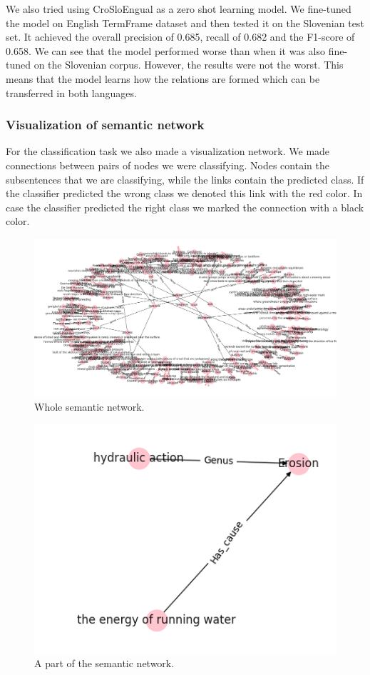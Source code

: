 \documentclass[fleqn,moreauthors,10pt]{ds_report}
\begin{document}
We also tried using CroSloEngual as a zero shot learning model. We fine-tuned the model on English TermFrame dataset and then tested it on the Slovenian test set. It achieved the overall precision of 0.685, recall of 0.682 and the F1-score of 0.658. We can see that the model performed worse than when it was also fine-tuned on the Slovenian corpus. However, the results were not the worst. This means that the model learns how the relations are formed which can be transferred in both languages.


\subsubsection{Visualization of semantic network}
For the classification task we also made a visualization network. We made connections between pairs of nodes we were classifying. Nodes contain the subsentences that we are classifying, while the links contain the predicted class. If the classifier predicted the wrong class we denoted this link with the red color. In case the classifier predicted the right class we marked the connection with a black color.
\begin{figure}[h]
    \centering
    \includegraphics[width=1\columnwidth]{network_vis.png}
    \caption{Whole semantic network.}
    \label{fig:sem_net1}
\end{figure}
\begin{figure}[h]
    \centering
    \includegraphics[width=0.6\columnwidth]{network_vis2.png}
    \caption{A part of the semantic network.}
    \label{fig:sem_net2}
\end{figure}
\end{document}
